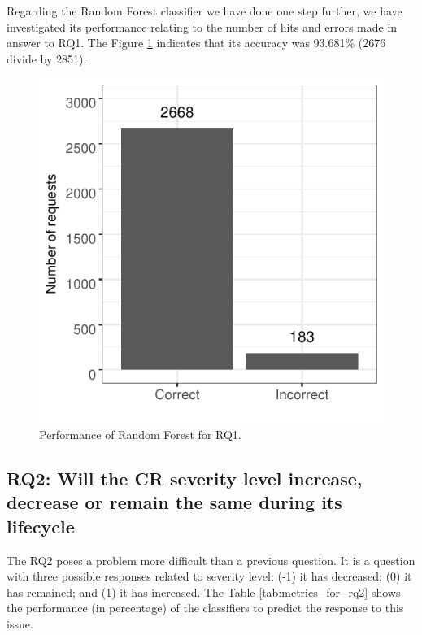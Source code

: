 \documentclass[10pt, conference]{IEEEtran}
\begin{document}
Regarding the Random Forest classifier we have done one step further, we have investigated its performance relating to the number of hits and errors made in answer to RQ1. The Figure \ref{fig:rf_performance_for_q1} indicates that its accuracy was 93.681\% (2676 divide by 2851). 

\begin{figure}[!hbt]
  \label{fig:rf_performance_for_q1}
  \includegraphics{figures/rf_performance_for_q1.pdf}
  \caption{Performance of Random Forest for RQ1.}
\end{figure}

\subsection{RQ2: Will the CR severity level increase, decrease or remain the same during its lifecycle}

The RQ2 poses a problem more difficult than a previous question. It is a question with three possible responses related to severity level: (-1) it has decreased; (0)  it has remained; and (1) it has increased. The Table \ref{tab:metrics_for_rq2} shows the performance (in percentage) of the classifiers to predict the response to this issue.
\end{document}
